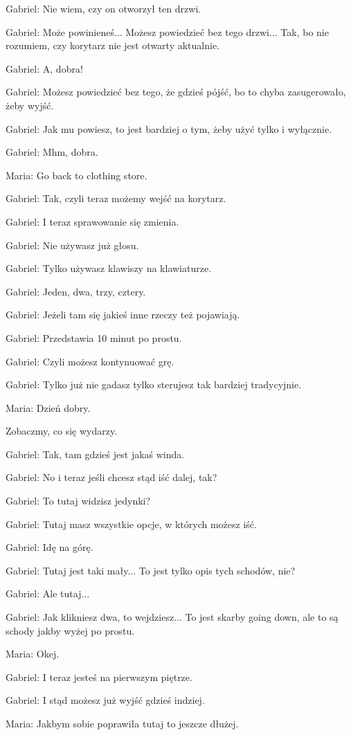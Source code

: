 Gabriel: Nie wiem, czy on otworzył ten drzwi.

Gabriel: Może powinieneś... Możesz powiedzieć bez tego drzwi... Tak, bo nie rozumiem, czy korytarz nie jest otwarty aktualnie.

Gabriel: A, dobra!

Gabriel: Możesz powiedzieć bez tego, że gdzieś pójść, bo to chyba zasugerowało, żeby wyjść.

Gabriel: Jak mu powiesz, to jest bardziej o tym, żeby użyć tylko i wyłącznie.

Gabriel: Mhm, dobra.

Maria: Go back to clothing store.

Gabriel: Tak, czyli teraz możemy wejść na korytarz.

Gabriel: I teraz sprawowanie się zmienia.

Gabriel: Nie używasz już głosu.

Gabriel: Tylko używasz klawiszy na klawiaturze.

Gabriel: Jeden, dwa, trzy, cztery.

Gabriel: Jeżeli tam się jakieś inne rzeczy też pojawiają.

Gabriel: Przedstawia 10 minut po prostu.

Gabriel: Czyli możesz kontynuować grę.

Gabriel: Tylko już nie gadasz tylko sterujesz tak bardziej tradycyjnie.

Maria: Dzień dobry.

Zobaczmy, co się wydarzy.

Gabriel: Tak, tam gdzieś jest jakaś winda.

Gabriel: No i teraz jeśli chcesz stąd iść dalej, tak?

Gabriel: To tutaj widzisz jedynki?

Gabriel: Tutaj masz wszystkie opcje, w których możesz iść.

Gabriel: Idę na górę.

Gabriel: Tutaj jest taki mały... To jest tylko opis tych schodów, nie?

Gabriel: Ale tutaj...

Gabriel: Jak klikniesz dwa, to wejdziesz... To jest skarby going down, ale to są schody jakby wyżej po prostu.

Maria: Okej.

Gabriel: I teraz jesteś na pierwszym piętrze.

Gabriel: I stąd możesz już wyjść gdzieś indziej.

Maria: Jakbym sobie poprawiła tutaj to jeszcze dłużej.


